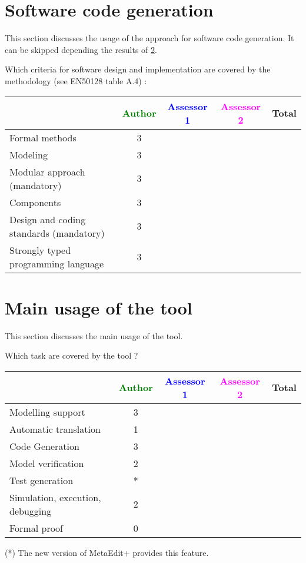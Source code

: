 \section{Software code generation}
This section discusses the usage of the approach for software code generation.
It can be skipped depending the results of \ref{main_usage}.

Which criteria for software design and implementation are covered by the methodology
(see EN50128 table A.4) :

\begin{tabular}{|l | c | c | c | c|}
\hline
& \textcolor{green}{Author} & \textcolor{blue}{Assessor 1} & \textcolor{magenta}{Assessor 2} & Total \\
\hline
Formal methods  &3 & & &  \\
\hline 
Modeling  &3 & & &  \\
\hline
Modular approach (mandatory) &3 & & &  \\
\hline
Components &3 & & &  \\
\hline
Design and coding standards (mandatory) &3 & & &  \\
\hline
Strongly typed programming language &3 & & &  \\
\hline

\end{tabular}



\section{Main usage of the tool}
\label{main_usage}

This section discusses the main usage of the tool.

Which task are covered by the tool ?


\begin{tabular}{|l | c | c | c | c|}
\hline
& \textcolor{green}{Author} & \textcolor{blue}{Assessor 1} & \textcolor{magenta}{Assessor 2} & Total \\
\hline 
Modelling support &3 & & &  \\
\hline
Automatic translation  & 1& & & \\
\hline
Code Generation  &3 & & & \\
\hline
Model verification &2 & & & \\
\hline
Test generation &* & & & \\
\hline
Simulation, execution, debugging & 2& & & \\
\hline
Formal proof &0 & & & \\
\hline
\end{tabular}
\begin{author_comment}
(*) The new version of MetaEdit+ provides this feature.
\end{author_comment}

